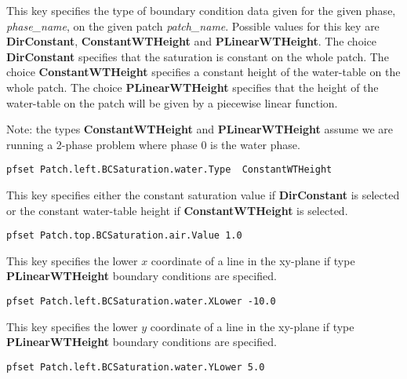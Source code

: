 {
This key specifies the type of boundary condition data given for the
given phase, {\em phase\_name}, on the given patch {\em patch\_name}.
Possible values for this key are {\bf DirConstant},
{\bf ConstantWTHeight} and {\bf PLinearWTHeight}.  The choice
{\bf DirConstant} specifies that the saturation is constant on the whole
patch.  The choice {\bf ConstantWTHeight} specifies a constant height of
the water-table on the whole patch.  The choice {\bf PLinearWTHeight}
specifies that the height of the water-table on the patch will be given
by a piecewise linear function.

Note: the types {\bf ConstantWTHeight} and {\bf PLinearWTHeight} assume
we are running a 2-phase problem where phase 0 is the water phase.
}
\begin{display}\begin{verbatim}
pfset Patch.left.BCSaturation.water.Type  ConstantWTHeight
\end{verbatim}\end{display}

{
This key specifies either the constant saturation value if
{\bf DirConstant} is selected or the constant water-table height if
{\bf ConstantWTHeight} is selected.
}
\begin{display}\begin{verbatim}
pfset Patch.top.BCSaturation.air.Value 1.0
\end{verbatim}\end{display}


{
This key specifies the lower $x$ coordinate of a line in the xy-plane if
type {\bf PLinearWTHeight} boundary conditions are specified.
}
\begin{display}\begin{verbatim}
pfset Patch.left.BCSaturation.water.XLower -10.0
\end{verbatim}\end{display}

{
This key specifies the lower $y$ coordinate of a line in the xy-plane if
type {\bf PLinearWTHeight} boundary conditions are specified.
}
\begin{display}\begin{verbatim}
pfset Patch.left.BCSaturation.water.YLower 5.0
\end{verbatim}\end{display}


